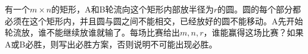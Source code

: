 \vspace{6pt} \par
有一个$m \times n$的矩形，A和B轮流向这个矩形内部放半径为$r$的圆。圆的每个部分都必须在这个矩形内，并且圆与圆之间不能相交，已经放好的圆不能移动。A先开始轮流放，谁不能继续放谁就输了。每场比赛给出$m,n,r$，谁能赢得这场比赛？如果A或B必胜，则写出必胜方案，否则说明不可能出现必胜。

